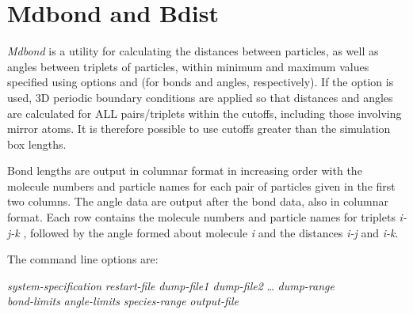 \documentclass[a4paper,twoside]{report}
\begin{document}
\section{Mdbond and Bdist}%

\emph{Mdbond} is a utility for calculating the distances between particles,
 as well as angles between triplets of particles,
 within minimum and maximum values specified using options
 and  (for bonds and angles, respectively). If the 
option is used, 3D periodic boundary conditions are applied so that
distances and angles are calculated for ALL pairs/triplets within the cutoffs,
including those involving mirror atoms. It is therefore possible to use cutoffs
greater than the simulation box lengths.
        
Bond lengths are output in columnar format in increasing order with
the molecule numbers and particle names for each pair of particles given in the
first two columns. The angle data are output after the bond data, also
in columnar format. Each row contains the molecule numbers and particle names
for triplets \emph{i-j-k} , followed by the angle formed about
molecule \emph{i} and the distances \emph{i-j} and \emph{i-k}.

The command line options are:

\begin{center}
 \textit{system-specification} \Lit{|}
 \textit{restart-file}
\Lit{[-d} \textit{dump-file1 dump-file2} \ldots\Lit{]}
\Lit{[-t} \textit{dump-range}\Lit{]} \\
\Lit{[-b} \textit{bond-limits}\Lit{]} 
\Lit{[-a} \textit{angle-limits}\Lit{]} 
\Lit{[-g} \textit{species-range}\Lit{]} 
\Lit{[-p]} 
\Lit{[-x]}
\Lit{[-j]}
\Lit{[-v]} 
\Lit{[-o} \textit{output-file}\Lit{]}
\end{center}
\end{document}
